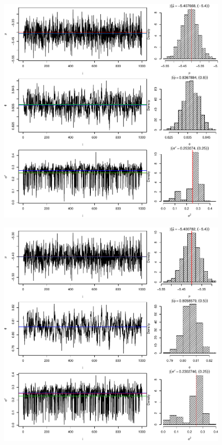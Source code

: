 \documentclass[12pt, a4paper]{article}
\begin{document}
\newpage
\begin{figure}[ht]
  \centering
  \includegraphics{img/p08s05_result035}
\end{figure}

\newpage
\begin{figure}[ht]
  \centering
  \includegraphics{img/p05s05_result035}
\end{figure}
\end{document}
